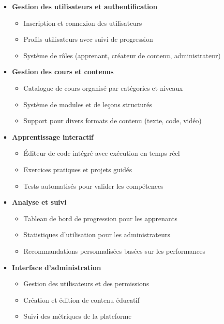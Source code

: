 \begin{itemize}
  \item \textbf{Gestion des utilisateurs et authentification}
    \begin{itemize}
      \item Inscription et connexion des utilisateurs
      \item Profils utilisateurs avec suivi de progression
      \item Système de rôles (apprenant, créateur de contenu, administrateur)
    \end{itemize}
  
  \item \textbf{Gestion des cours et contenus}
    \begin{itemize}
      \item Catalogue de cours organisé par catégories et niveaux
      \item Système de modules et de leçons structurés
      \item Support pour divers formats de contenu (texte, code, vidéo)
    \end{itemize}
  
  \item \textbf{Apprentissage interactif}
    \begin{itemize}
      \item Éditeur de code intégré avec exécution en temps réel
      \item Exercices pratiques et projets guidés
      \item Tests automatisés pour valider les compétences
    \end{itemize}
  
  \item \textbf{Analyse et suivi}
    \begin{itemize}
      \item Tableau de bord de progression pour les apprenants
      \item Statistiques d'utilisation pour les administrateurs
      \item Recommandations personnalisées basées sur les performances
    \end{itemize}
  
  \item \textbf{Interface d'administration}
    \begin{itemize}
      \item Gestion des utilisateurs et des permissions
      \item Création et édition de contenu éducatif
      \item Suivi des métriques de la plateforme
    \end{itemize}
\end{itemize}

